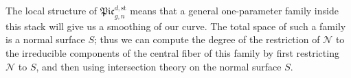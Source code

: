 \documentclass[11pt]{amsart}
\theoremstyle{definition}
\theoremstyle{definition}
\begin{document}
\begin{center}
\end{center}

The local structure of $\mathfrak{Pic}_{g,n}^{d,\text{st}}$ means that a general one-parameter family inside this stack will give us a smoothing of our curve. The total space of such a family is a normal surface $S$; thus we can compute the degree of the restriction of $\mathcal{N}$ to the irreducible components of the central fiber of this family by first restricting $\mathcal{N}$ to $S$, and then using intersection theory on the normal surface $S$.
\end{document}
